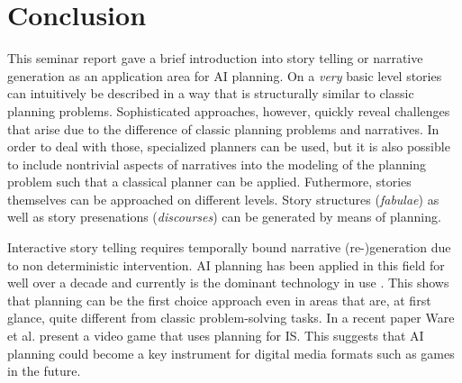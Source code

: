 \section{Conclusion}\label{conclusion}
This seminar report gave a brief introduction into story telling or narrative generation as an application area for AI planning. On a \emph{very} basic level stories can intuitively be described in a way that is structurally similar to classic planning problems. Sophisticated approaches, however, quickly reveal challenges that arise due to the difference of classic planning problems and narratives. In order to deal with those, specialized planners can be used, but it is also possible to include nontrivial aspects of narratives into the modeling of the planning problem such that a classical planner can be applied. Futhermore, stories themselves can be approached on different levels. Story structures (\emph{fabulae}) as well as story presenations (\emph{discourses}) can be generated by means of planning.

Interactive story telling requires temporally bound narrative \mbox{(re-)}generation due to non deterministic intervention. AI planning has been applied in this field for well over a decade and currently is the dominant technology in use \cite{Porteous10}. This shows that planning can be the first choice approach even in areas that are, at first glance, quite different from classic problem-solving tasks. In a recent paper Ware et al. \cite{Ware15} present a video game that uses planning for IS. This suggests that AI planning could become a key instrument for digital media formats such as games in the future.%

